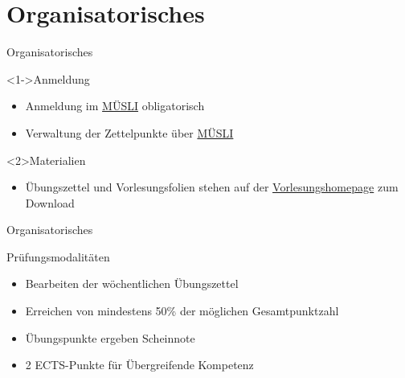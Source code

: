 \documentclass[
	vorläufig=true,
	datum=2016-10-21,
	titel={Einführung und grundlegende Bedienung},
	web=true,
]{../tex/latexkurs-slides}
\begin{document}
\section{Organisatorisches}

\begin{frame}[t]{Organisatorisches}%
	\begin{block}<1->{Anmeldung}
		\begin{itemize}
			\item	 Anmeldung im \href{https://www.mathi.uni-heidelberg.de/muesli/lecture/view/601}{MÜSLI} obligatorisch
			\item Verwaltung der Zettelpunkte über \href{https://www.mathi.uni-heidelberg.de/muesli/lecture/view/484}{MÜSLI}
		\end{itemize}
	\end{block}
	\begin{block}{Materialien}
		\begin{itemize}
			\item Übungszettel und Vorlesungsfolien stehen auf der \href{http://latexkurs.github.io}{Vorlesungshomepage} zum Download
		\end{itemize}
	\end{block}
\end{frame}

\begin{frame}[t]{Organisatorisches}%
	\begin{block}{Prüfungsmodalitäten}
		\begin{itemize}
			\item Bearbeiten der wöchentlichen Übungszettel
			\item Erreichen von mindestens 50\% der möglichen Gesamtpunktzahl
			\item Übungspunkte ergeben Scheinnote 
			\item 2 ECTS-Punkte für Übergreifende Kompetenz
		\end{itemize}
	\end{block}
\end{frame}
\end{document}
